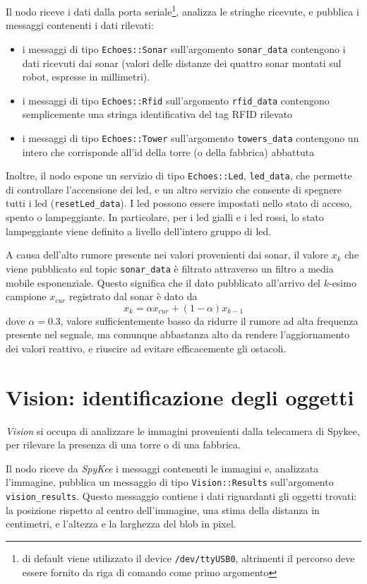 Il nodo riceve i dati dalla porta seriale\footnote{di default viene utilizzato il device \texttt{/dev/ttyUSB0}, altrimenti il percorso deve essere fornito da riga di comando come primo argomento}, analizza le stringhe ricevute, e pubblica i messaggi contenenti i dati rilevati:
\begin{itemize}
	\item i messaggi di tipo \verb|Echoes::Sonar| sull'argomento \verb|sonar_data| contengono i dati ricevuti dai sonar (valori delle distanze dei quattro sonar montati sul robot, espresse in millimetri).
	\item i messaggi di tipo \verb|Echoes::Rfid| sull'argomento \verb|rfid_data| contengono semplicemente una stringa identificativa del tag RFID rilevato
	\item i messaggi di tipo \verb|Echoes::Tower| sull'argomento \verb|towers_data| contengono un intero che corrisponde all'id della torre (o della fabbrica) abbattuta
\end{itemize}
Inoltre, il nodo espone un servizio di tipo \verb|Echoes::Led|, \verb|led_data|, che permette di controllare l'accensione dei led, e un altro servizio che consente di spegnere tutti i led (\verb|resetLed_data|). I led possono essere impostati nello stato di acceso, spento o lampeggiante. In particolare, per i led gialli e i led rossi, lo stato lampeggiante viene definito a livello dell'intero gruppo di led.

A causa dell'alto rumore presente nei valori provenienti dai sonar, il valore $x_k$ che viene pubblicato sul topic \verb|sonar_data| è filtrato attraverso un filtro a media mobile esponenziale. Questo significa che il dato pubblicato all'arrivo del $k$-esimo campione $x_{cur}$ registrato dal sonar è dato da
  \[ x_k = \alpha x_{cur} + (1 - \alpha) x_{k-1} \]
dove $\alpha = 0.3$, valore sufficientemente basso da ridurre il rumore ad alta frequenza presente nel segnale, ma comunque abbastanza alto da rendere l'aggiornamento dei valori reattivo, e riuscire ad evitare efficacemente gli ostacoli.

\section{Vision: identificazione degli oggetti}

\emph{Vision} si occupa di analizzare le immagini provenienti dalla telecamera di Spykee, per rilevare la presenza di una torre o di una fabbrica. 

Il nodo riceve da \emph{SpyKee} i messaggi contenenti le immagini e, analizzata l'immagine, pubblica un messaggio di tipo \verb|Vision::Results| sull'argomento \verb|vision_results|. Questo messaggio contiene i dati riguardanti gli oggetti trovati: la posizione rispetto al centro dell'immagine, una stima della distanza in centimetri, e l'altezza e la larghezza del blob in pixel. %

